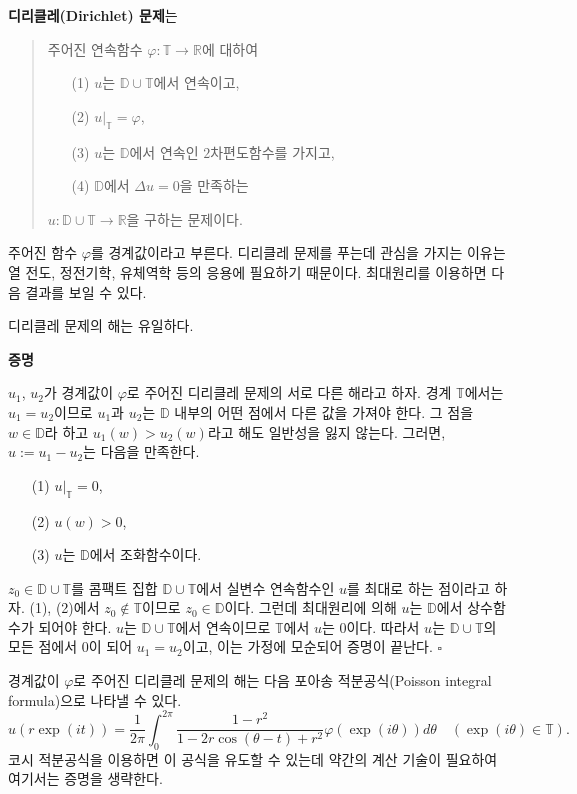 \textbf{디리클레(Dirichlet) 문제}는 
\begin{quote}
주어진 연속함수 $\varphi: \mathbb T \to \mathbb R$에 대하여
\begin{itemize}
\item[(1)] $u$는 $\mathbb D \cup \mathbb T$에서 연속이고,
\item[(2)] $u|_{\mathbb T}=\varphi$,
\item[(3)] $u$는 $\mathbb D$에서 연속인 $2$차편도함수를 가지고,
\item[(4)] $\mathbb D$에서 $\Delta u  = 0$을 만족하는
\end{itemize}
$u: \mathbb D \cup \mathbb T \to \mathbb R$을 구하는 문제이다.
\end{quote}

주어진 함수 $\varphi$를 경계값이라고 부른다.
디리클레 문제를 푸는데 관심을 가지는 이유는
열 전도, 정전기학, 유체역학 등의 응용에 필요하기 때문이다.
최대원리를 이용하면 다음 결과를 보일 수 있다.

\begin{saltprop}{}{} \label{prpo-5-1}
디리클레 문제의 해는 유일하다.
\end{saltprop}

{\bf 증명}

$u_1$, $u_2$가 경계값이 $\varphi$로 주어진 디리클레 문제의 
서로 다른 해라고 하자. 경계 $\mathbb T$에서는 $u_1 = u_2$이므로
$u_1$과 $u_2$는 $\mathbb D$ 내부의 어떤 점에서 다른 값을 가져야 한다.
그 점을 $w\in\mathbb D$라 하고 $u_1(w) > u_2(w)$라고 해도 일반성을 잃지 않는다.
그러면, $u:=u_1 - u_2$는 다음을 만족한다.
\begin{itemize}
\item[(1)] $u|_{\mathbb T}=0$,
\item[(2)] $u(w)>0$,
\item[(3)] $u$는 $\mathbb D$에서 조화함수이다.
\end{itemize}
$z_0\in \mathbb D\cup \mathbb T$를
콤팩트 집합 $ \mathbb D\cup \mathbb T$에서
실변수 연속함수인 $u$를 최대로 하는 점이라고 하자.
(1), (2)에서 $z_0\not\in \mathbb T$이므로
$z_0\in \mathbb D$이다.
그런데 최대원리에 의해 $u$는 $\mathbb D$에서 상수함수가 되어야 한다.
$u$는  $ \mathbb D\cup \mathbb T$에서 연속이므로
$\mathbb T$에서 $u$는 $0$이다.
따라서 $u$는  $ \mathbb D\cup \mathbb T$의 모든 점에서 $0$이 되어
$u_1 = u_2$이고, 이는 가정에 모순되어 증명이 끝난다.
\hfill  $\square$

\begin{salt_remark}\label{rem-5-1}
경계값이 $\varphi$로 주어진 디리클레 문제의 해는 
다음 포아송 적분공식(Poisson integral formula)으로 나타낼 수 있다.
\[
u(r\exp(it)) = \dfrac1{2\pi} \int_0^{2\pi} 
\dfrac{1-r^2}{1-2r\cos(\theta -t) + r^2} \varphi(\exp(i\theta))d\theta
\quad (\exp(i\theta) \in \mathbb T).
\]
코시 적분공식을 이용하면 이 공식을 유도할 수 있는데
약간의 계산 기술이 필요하여 여기서는 증명을 생략한다.
\end{salt_remark}

